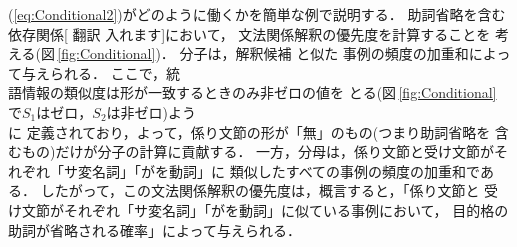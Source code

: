 (\ref{eq:Conditional2})がどのように働くかを簡単な例で説明する．
助詞省略を含む依存関係[ 翻訳 入れます]において，
文法関係解釈の優先度を計算することを
考える(図\,\ref{fig:Conditional})．
分子は，解釈候補  と似た
事例の頻度の加重和によって与えられる．
ここで，統\\語情報の類似度は形が一致するときのみ非ゼロの値を
とる(図\,\ref{fig:Conditional}\,で$S_1$はゼロ，\hspace{-0.5mm}$S_2$は非ゼロ)よう\\に
定義されており，よって，係り文節の形が「無」のもの(つまり助詞省略を
含むもの)だけが分子の計算に貢献する．
一方，分母は，係り文節と受け文節がそれぞれ「サ変名詞」「がを動詞」に
類似したすべての事例の頻度の加重和である．
したがって，この文法関係解釈の優先度は，概言すると，「係り文節と
受け文節がそれぞれ「サ変名詞」「がを動詞」に似ている事例において，
目的格の助詞が省略される確率」によって与えられる．
